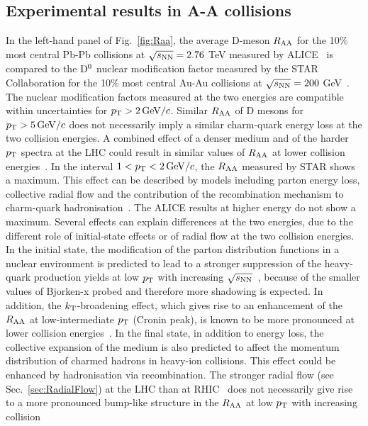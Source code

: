 \subsection{Experimental results in A-A collisions}
\label{sec:resAAcap2}
In the left-hand panel of Fig.~\ref{fig:Raa}, the average D-meson $R_{\rm AA}$ 
for the 10\% most central Pb-Pb collisions at $\sqrt{s_{\rm NN}} = 2.76$ TeV 
measured by ALICE~\cite{Adam:2015sza} is compared to the ${\rm D^0}$ 
nuclear modification factor measured by the STAR Collaboration
for the 10\% most central Au-Au collisions at $\sqrt{s_{\rm NN}} = 200$ GeV~\cite{Adamczyk:2014uip}. 
The nuclear modification factors measured at the two energies are compatible within uncertainties for $p_{\rm T} > 2\, \mathrm{GeV}/c$.
Similar $R_{\rm AA}$ of D mesons for $p_{\rm T} > 5 \,\mathrm{GeV}/c$ does not necessarily imply a similar charm-quark
energy loss at the two collision energies. A combined effect of a denser medium
and of the harder $p_{\rm T}$ spectra at the LHC could result in similar values of $R_{\rm AA}$ at lower
collision energies~\cite{Baier:2002tc}. In the interval $1 < p_{\rm T} < 2\, \mathrm{GeV}/c$, the $R_{\rm AA}$ 
measured by STAR shows a maximum. This effect can be described 
by models including parton energy loss, collective
radial flow and the contribution of the recombination mechanism to 
charm-quark hadronisation~\cite{Abelev:2006db}. The ALICE results at higher energy 
do not show a maximum. Several effects can explain differences at the two energies, 
due to the different role of initial-state effects or of radial flow at the 
two collision energies. In the initial state, the modification
of the parton distribution functions in a nuclear environment is predicted to lead
to a stronger suppression of the heavy-quark production yields at low $p_{\rm T}$ with increasing
$\sqrt{s_{\rm NN}}$~\cite{Eskola:2009uj}, because of the smaller values of Bjorken-x probed 
and therefore more shadowing is expected. In addition, the 
$k_{\rm T}$-broadening effect, which gives rise to an enhancement of the $R_{\rm AA}$ at low-intermediate
$p_{\rm T}$ (Cronin peak), is known to be more pronounced at lower collision energies~\cite{Wang:1998ww,Vogt:2001nh}.
In the final state, in addition to energy loss, the collective expansion of the medium is
also predicted to affect the momentum distribution of charmed hadrons in heavy-ion collisions.
This effect could be enhanced by hadronisation via recombination.
The stronger radial flow (see Sec.~\ref{sec:RadialFlow}) at the LHC than at 
RHIC~\cite{Abelev:2008ab,Abelev:2013vea,Abelev:2012wca} does not necessarily give rise
to a more pronounced bump-like structure in the $R_{\rm AA}$ at low $p_{\rm T}$ with increasing collision
